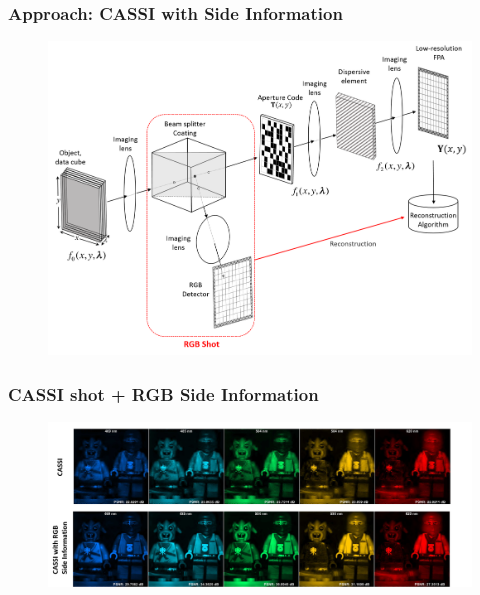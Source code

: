 \documentclass{beamer}
\begin{document}
\begin{frame}
\frametitle{Approach: CASSI with Side Information}

\vspace{-10pt}
\begin{figure}
\includegraphics[scale=0.4]{FiguresUpd/systema.png}
\end{figure}

\end{frame}


\begin{frame}
\frametitle{CASSI shot + RGB Side Information}

\vspace{-10pt}
\begin{figure}
\includegraphics[scale=0.43]{FiguresUpd/CASSIandRGB.png}
\end{figure}

\end{frame}

\end{document}
